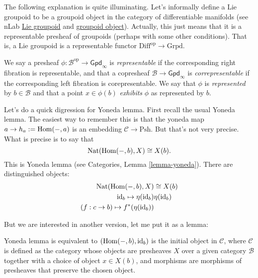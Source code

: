 \medskip\noindent
The following explanation is quite illuminating.
Let's informally define a Lie groupoid to be a groupoid object
in the category of differentiable manifolds 
(see nLab \href{url}{Lie groupoid} and
\href{https://ncatlab.org/nlab/show/Lie+groupoid}{groupoid object}).
Actually, this just means that it is a representable
presheaf of groupoids (perhaps with some other conditions).
That is, a Lie groupoid is a representable functor
$\text{Diff}^{\text{op}}\to \text{Grpd}$.

\begin{definition}
\label{definition-representable-presheaf}
We say a presheaf $\phi:\mathcal{B}^{\text{op}}\to \mathsf{Gpd}_\infty$
is {\it representable} if the corresponding right fibration
is representable, and that a copresheaf
$\mathcal{B}\to \mathsf{Gpd}_\infty$ is {\it correpresentable} 
if the corresponding left fibration is corepresentable.
We say that $\phi$ is {\it represented} by $b \in \mathcal{B}$ 
and that a point $x \in \phi(b)$ {\it exhibits} $\phi$ 
as represented by $b$.
\end{definition}

\medskip\noindent
Let's do a quick digression for Yoneda lemma.
First recall the usual Yoneda lemma.
The easiest way to remember this is that
the yoneda map $a \to h_a:=\mathop{\mathrm{Hom}}\nolimits(-,a)$ is an
embedding $\mathcal{C} \to \text{Psh}$.
But that's not very precise.
What is precise is to say that
$$
\text{Nat}(\mathop{\mathrm{Hom}}\nolimits(-,b),X) \cong X(b).
$$
This is Yoneda lemma (see Categories, Lemma \ref{lemma-yoneda}).
There are distinguished objects:
\begin{align*}
\text{Nat}(\mathop{\mathrm{Hom}}\nolimits(-,b),X)&\cong X(b)\\
\text{id}_b \mapsto \eta(\text{id}_b)& \eta(\text{id}_b)\\
(f:c \to b) \mapsto f^*(\eta(\text{id}_b))&
\end{align*}

\noindent
But we are interested in another version,
let me put it as a lemma:

\begin{lemma}
\label{lemma-yoneda-equivalence-presheave-category}
Yoneda lemma is equivalent to $(\mathop{\mathrm{Hom}}\nolimits(-,b),\text{id}_b)$ is
the initial object in $\mathcal{C}$, where $\mathcal{C}$ is defined as the
category whose objects are presheaves $X$
over a given category $\mathcal{B}$ together with a
choice of object $x \in X(b)$,
and morphisms are morphisms of presheaves that preserve the
chosen object.
\end{lemma}

